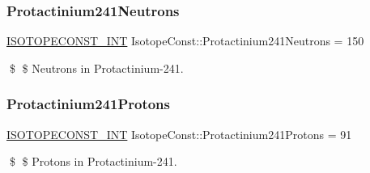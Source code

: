 \subsubsection{\texorpdfstring{Protactinium241\+Neutrons}{Protactinium241Neutrons}}
{\footnotesize\ttfamily \mbox{\hyperlink{group___isotope_const-_macros_ga5f18360b3e99483a35c32d789e62621c}{I\+S\+O\+T\+O\+P\+E\+C\+O\+N\+S\+T\+\_\+\+I\+NT}} Isotope\+Const\+::\+Protactinium241\+Neutrons = 150}

\$ \$ Neutrons in Protactinium-\/241. \mbox{\label{group___isotope_const-_protactinium-_pa241_ga6141335e587b00dd1ee24da6cf1ba240}} 
\subsubsection{\texorpdfstring{Protactinium241\+Protons}{Protactinium241Protons}}
{\footnotesize\ttfamily \mbox{\hyperlink{group___isotope_const-_macros_ga5f18360b3e99483a35c32d789e62621c}{I\+S\+O\+T\+O\+P\+E\+C\+O\+N\+S\+T\+\_\+\+I\+NT}} Isotope\+Const\+::\+Protactinium241\+Protons = 91}

\$ \$ Protons in Protactinium-\/241. 